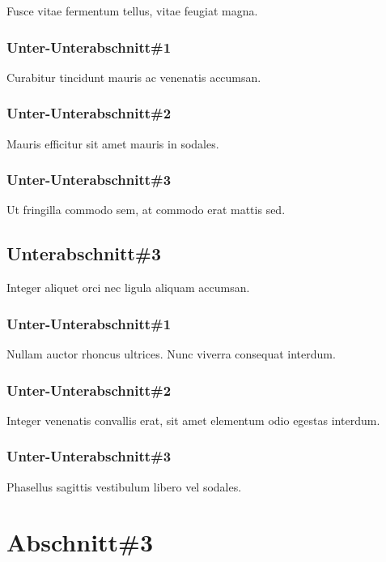 Fusce vitae fermentum tellus, vitae feugiat magna. 

\subsubsection{Unter-Unterabschnitt\#1}

Curabitur tincidunt mauris ac venenatis accumsan. 

\subsubsection{Unter-Unterabschnitt\#2}

Mauris efficitur sit amet mauris in sodales. 

\subsubsection{Unter-Unterabschnitt\#3}

Ut fringilla commodo sem, at commodo erat mattis sed. 

\subsection{Unterabschnitt\#3}

Integer aliquet orci nec ligula aliquam accumsan. 

\subsubsection{Unter-Unterabschnitt\#1}

Nullam auctor rhoncus ultrices. Nunc viverra consequat interdum. 

\subsubsection{Unter-Unterabschnitt\#2}

Integer venenatis convallis erat, sit amet elementum odio egestas interdum. 

\subsubsection{Unter-Unterabschnitt\#3}

Phasellus sagittis vestibulum libero vel sodales. 

\section{Abschnitt\#3}

